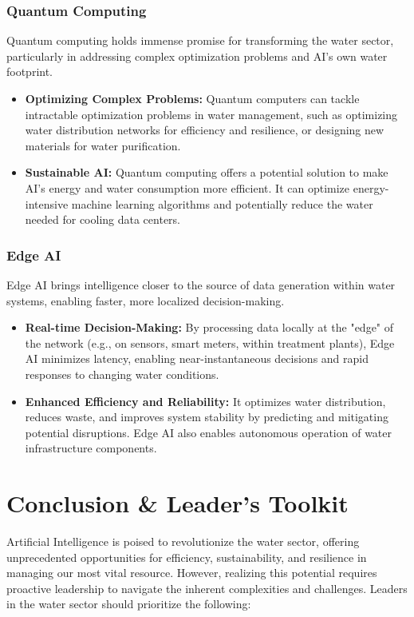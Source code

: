 \subsubsection{Quantum Computing}
Quantum computing holds immense promise for transforming the water sector, particularly in addressing complex optimization problems and AI's own water footprint.
\begin{itemize}
    \item \textbf{Optimizing Complex Problems:} Quantum computers can tackle intractable optimization problems in water management, such as optimizing water distribution networks for efficiency and resilience, or designing new materials for water purification.
    \item \textbf{Sustainable AI:} Quantum computing offers a potential solution to make AI's energy and water consumption more efficient. It can optimize energy-intensive machine learning algorithms and potentially reduce the water needed for cooling data centers.
\end{itemize}

\subsubsection{Edge AI}
Edge AI brings intelligence closer to the source of data generation within water systems, enabling faster, more localized decision-making.
\begin{itemize}
    \item \textbf{Real-time Decision-Making:} By processing data locally at the "edge" of the network (e.g., on sensors, smart meters, within treatment plants), Edge AI minimizes latency, enabling near-instantaneous decisions and rapid responses to changing water conditions.
    \item \textbf{Enhanced Efficiency and Reliability:} It optimizes water distribution, reduces waste, and improves system stability by predicting and mitigating potential disruptions. Edge AI also enables autonomous operation of water infrastructure components.
\end{itemize}

\section{Conclusion \& Leader's Toolkit}

Artificial Intelligence is poised to revolutionize the water sector, offering unprecedented opportunities for efficiency, sustainability, and resilience in managing our most vital resource. However, realizing this potential requires proactive leadership to navigate the inherent complexities and challenges. Leaders in the water sector should prioritize the following:

